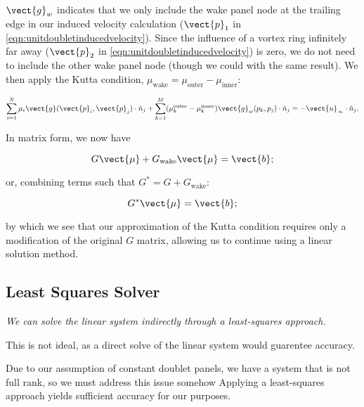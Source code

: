 \where \(\vect{g}_{w}\) indicates that we only include the wake panel node at the
trailing edge in our induced velocity calculation (\(\vect{p}_1\) in \cref{eqn:unitdoubletinducedvelocity}).
Since the influence of a vortex ring infinitely far away (\(\vect{p}_2\) in \cref{eqn:unitdoubletinducedvelocity}) is zero,
we do not need to include the other wake panel node (though we could with the same result).
We then apply the Kutta condition, \(\mu_\text{wake}= \mu_\text{outer} - \mu_\text{inner}\):

\begin{equation}
    \sum_{i=1}^N \mu_i \vect{g}(\vect{p}_i,\vect{p}_j) \cdot \hat{n}_j
        + \sum_{k=1}^M (\mu^\text{outer}_k - \mu^\text{inner}_k) \vect{g}_w(p_k, p_j) \cdot \hat{n}_j
        = - \vect{u}_\infty \cdot \hat{n}_j.
\end{equation}

\noindent In matrix form, we now have

\begin{equation}
    G \vect{\mu} + G_\text{wake} \vect{\mu} = \vect{b};
\end{equation}

\noindent or, combining terms such that \(G^* = G + G_\text{wake}\):

\begin{equation}
    G^* \vect{\mu} = \vect{b};
\end{equation}

\noindent by which we see that our approximation of the Kutta condition requires only a modification of the original \(G\) matrix, allowing us to continue using a linear solution method.

\subsection{Least Squares Solver}

\begin{assumption}

    \textit{We can solve the linear system indirectly through a least-squares approach.}

\smallskip

    \limit This is not ideal, as a direct solve of the linear system would guarentee accuracy.

\smallskip

    \why Due to our assumption of constant doublet panels, we have a system that is not full rank, so we must address this issue somehow
    Applying a least-squares approach yields sufficient accuracy for our purposes.

\end{assumption}

